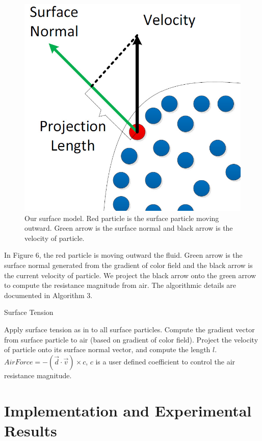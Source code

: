 \begin{figure}[htb]
  \centering
  \includegraphics[width=.6\linewidth]{surface}
  \caption{\label{fig:firstExample} Our surface model. Red particle is
    the surface particle moving outward. Green arrow is the surface
    normal and black arrow is the velocity of particle.}
\end{figure}

In Figure 6, the red particle is moving outward the fluid. Green arrow
is the surface normal generated from the gradient of color field and
the black arrow is the current velocity of particle.  We project the
black arrow onto the green arrow to compute the resistance magnitude
from air. The algorithmic details are documented in Algorithm 3.

\begin{algorithm}[htb]
\caption{Surface Tension}
\begin{algorithmic}[1]
\STATE Apply surface tension as in \cite{Muller:2003:PFS:846276.846298} to all surface particles.
\STATE Compute the gradient vector from surface particle to air (based on gradient of color field).
\STATE Project the velocity of particle onto its surface normal vector, and compute the length $l$.
\STATE $AirForce=-(\vec{d} \cdot \vec{v})\times c$, $c$ is a user defined coefficient to control the air resistance magnitude.
\end{algorithmic}
\end{algorithm}


\section{Implementation and Experimental Results}

